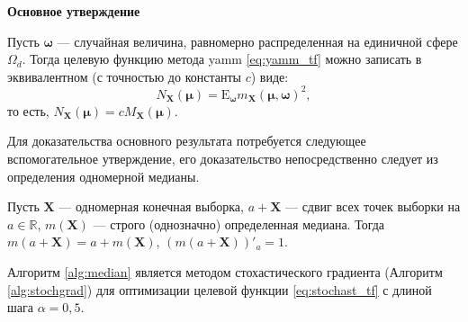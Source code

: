 \vspace{1ex}

\textbf{Основное утверждение}

Пусть $\boldsymbol{\omega}$ --- случайная величина, равномерно распределенная на единичной сфере $\Omega_d$. Тогда целевую функцию метода yamm \eqref{eq:yamm_tf} можно записать в эквивалентном (с точностью до константы $c$) виде:
\begin{equation}\label{eq:stochast_tf}
N_{\mathbf{X}}(\boldsymbol{\mu}) = \mathrm{E}_{\boldsymbol{\omega}} m_{\mathbf{X}} (\boldsymbol{ \mu}, \boldsymbol{ \omega})^2,
\end{equation}
то есть, $N_{\mathbf{X}}(\boldsymbol{\mu}) = c M_{\mathbf{X}}(\boldsymbol{\mu})$.

Для доказательства основного результата потребуется следующее вспомогательное утверждение, его доказательство непосредственно следует из определения одномерной медианы.
\begin{proposition}
Пусть $\mathbf{X}$ --- одномерная конечная выборка, $a + \mathbf{X}$ --- сдвиг всех точек выборки на $a \in \mathbb{R}$, $m(\mathbf{X})$ --- строго (однозначно) определенная медиана. Тогда $m(a + \mathbf{X}) = a + m(\mathbf{X})$, $\left(m(a + \mathbf{X}) \right)'_a = 1$.
\end{proposition}

\begin{theorem}\label{eq:thetheorem}
Алгоритм \ref{alg:median} является методом стохастического градиента (Алгоритм \ref{alg:stochgrad}) для оптимизации целевой функции \eqref{eq:stochast_tf} с длиной шага $\alpha = 0{,}5$.
\end{theorem}

